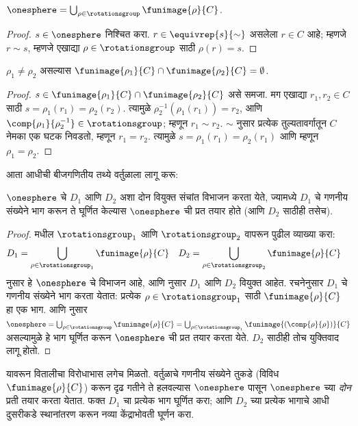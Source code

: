 \documentclass[../../../include/open-logic-section]{subfiles}
\begin{document}
\begin{lem}
$\onesphere = \bigcup_{\rho \in \rotationsgroup} \funimage{\rho}{C}$.
\end{lem}

\begin{proof}
$s \in \onesphere$ निश्चित करा. $r \in \equivrep{s}{\sim}$ असलेला $r \in C$ आहे; म्हणजे $r \sim s$, म्हणजे एखाद्या $\rho \in \rotationsgroup$ साठी $\rho(r) = s$.
\end{proof}

\begin{lem}
$\rho_1 \neq \rho_2$ असल्यास $\funimage{\rho_1}{C} \cap \funimage{\rho_2}{C} = \emptyset$.
\end{lem}

\begin{proof}
$s \in \funimage{\rho_{1}}{C} \cap \funimage{\rho_{2}}{C}$ असे समजा. मग एखाद्या $r_{1}, r_{2} \in C$ साठी $s = \rho_{1}(r_{1}) = \rho_{2}(r_{2})$.
त्यामुळे $\rho^{-1}_2(\rho_1(r_1)) = r_2$, आणि $\comp{\rho_1}{\rho^{-1}_2} \in \rotationsgroup$; म्हणून $r_{1} \sim
r_{2}$. $\sim$ नुसार प्रत्येक तुल्यतावर्गातून $C$ नेमका एक घटक निवडतो, म्हणून $r_1 = r_2$. त्यामुळे $s = \rho_1(r_1) = \rho_2(r_1)$ आणि म्हणून $\rho_1 = \rho_2$.
\end{proof}

आता आधीची बीजगणितीय तथ्ये वर्तुळाला लागू करू:

\begin{lem}
$\onesphere$ चे $D_{1}$ आणि $D_{2}$ अशा दोन वियुक्त संचांत विभाजन करता येते, ज्यामध्ये $D_{1}$ चे गणनीय संख्येने भाग करून ते घूर्णित केल्यास $\onesphere$ ची प्रत तयार होते (आणि $D_{2}$ साठीही तसेच).
\end{lem}

\begin{proof}
 मधील $\rotationsgroup_{1}$ आणि $\rotationsgroup_{2}$ वापरून पुढील व्याख्या करा:
\begin{align*}
	D_{1} &= \bigcup_{\rho \in \rotationsgroup_1} \funimage{\rho}{C} &
	D_{2} &= \bigcup_{\rho \in \rotationsgroup_2} \funimage{\rho}{C}
\end{align*}
 नुसार हे $\onesphere$ चे विभाजन आहे, आणि  नुसार $D_1$ आणि $D_2$ वियुक्त आहेत. रचनेनुसार $D_1$ चे गणनीय संख्येने भाग करता येतात: प्रत्येक $\rho \in \rotationsgroup_1$ साठी $\funimage{\rho}{C}$ हा एक भाग.  आणि  नुसार $\onesphere = \bigcup_{\rho \in
\rotationsgroup}\funimage{\rho}{C} = \bigcup_{\rho \in
\rotationsgroup_1}\funimage{(\comp{\rho}{\rho})}{C}$ असल्यामुळे हे भाग घूर्णित करून $\onesphere$ ची प्रत तयार करता येते. $D_2$ साठीही तोच युक्तिवाद लागू होतो. \end{proof}\noindent यावरून वितालीचा विरोधाभास लगेच मिळतो. वर्तुळाचे गणनीय संख्येने तुकडे (विविध $\funimage{\rho}{C}$) करून दृढ गतीने ते हलवल्यास $\onesphere$ पासून $\onesphere$ च्या \emph{दोन} प्रती तयार करता येतात. फक्त $D_1$ चा प्रत्येक भाग घूर्णित करा; आणि $D_2$ च्या प्रत्येक भागाचे आधी दुसरीकडे स्थानांतरण करून नव्या केंद्राभोवती घूर्णन करा.
\end{document}
